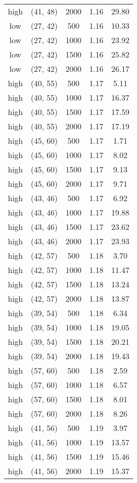 \begin{tabular}{c c c c c}
high & (41, 48) &  2000 & 1.16 & 29.80 \\
low & (27, 42) &  500 & 1.16 & 10.33 \\
low & (27, 42) &  1000 & 1.16 & 23.92 \\
low & (27, 42) &  1500 & 1.16 & 25.82 \\
low & (27, 42) &  2000 & 1.16 & 26.17 \\
high & (40, 55) &  500 & 1.17 & 5.11 \\
high & (40, 55) &  1000 & 1.17 & 16.37 \\
high & (40, 55) &  1500 & 1.17 & 17.59 \\
high & (40, 55) &  2000 & 1.17 & 17.19 \\
high & (45, 60) &  500 & 1.17 & 1.71 \\
high & (45, 60) &  1000 & 1.17 & 8.02 \\
high & (45, 60) &  1500 & 1.17 & 9.13 \\
high & (45, 60) &  2000 & 1.17 & 9.71 \\
high & (43, 46) &  500 & 1.17 & 6.92 \\
high & (43, 46) &  1000 & 1.17 & 19.88 \\
high & (43, 46) &  1500 & 1.17 & 23.62 \\
high & (43, 46) &  2000 & 1.17 & 23.93 \\
high & (42, 57) &  500 & 1.18 & 3.70 \\
high & (42, 57) &  1000 & 1.18 & 11.47 \\
high & (42, 57) &  1500 & 1.18 & 13.24 \\
high & (42, 57) &  2000 & 1.18 & 13.87 \\
high & (39, 54) &  500 & 1.18 & 6.34 \\
high & (39, 54) &  1000 & 1.18 & 19.05 \\
high & (39, 54) &  1500 & 1.18 & 20.21 \\
high & (39, 54) &  2000 & 1.18 & 19.43 \\
high & (57, 60) &  500 & 1.18 & 2.59 \\
high & (57, 60) &  1000 & 1.18 & 6.57 \\
high & (57, 60) &  1500 & 1.18 & 8.01 \\
high & (57, 60) &  2000 & 1.18 & 8.26 \\
high & (41, 56) &  500 & 1.19 & 3.97 \\
high & (41, 56) &  1000 & 1.19 & 13.57 \\
high & (41, 56) &  1500 & 1.19 & 15.46 \\
high & (41, 56) &  2000 & 1.19 & 15.37 \\

\end{tabular}

